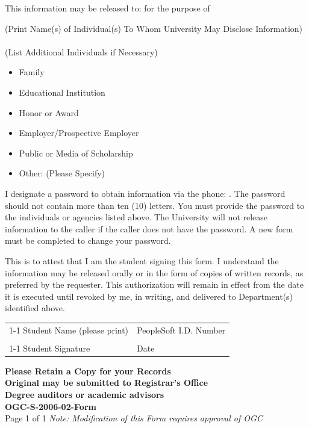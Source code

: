 \documentclass[12pt]{article}
\begin{document}
\vspace{0.5em}
This information may be released to: \underline{\hspace{5cm}} for the purpose of \underline{\hspace{5cm}}\\
\begin{center}
(Print Name(s) of Individual(s) To Whom University May Disclose Information)\\
\vspace{0.5em}
\underline{\hspace{10cm}}\\
(List Additional Individuals if Necessary)
\end{center}

\begin{itemize}[leftmargin=0.7cm, label=$\square$]
\item Family
\item Educational Institution
\item Honor or Award
\item Employer/Prospective Employer
\item Public or Media of Scholarship
\item Other: (Please Specify)\underline{\hspace{10cm}}
\end{itemize}

\vspace{0.5em}
I designate a password to obtain information via the phone: \underline{\hspace{5cm}}. The password should not contain more than ten (10) letters. You must provide the password to the individuals or agencies listed above. The University will not release information to the caller if the caller does not have the password. A new form must be completed to change your password.

\vspace{0.5em}
This is to attest that I am the student signing this form. I understand the information may be released orally or in the form of copies of written records, as preferred by the requester. This authorization will remain in effect from the date it is executed until revoked by me, in writing, and delivered to Department(s) identified above.

\vspace{2em}
\noindent\begin{tabular}{@{}p{}p{}@{}}
\cline{1-1}\cline{2-2}
Student Name (please print) & PeopleSoft I.D. Number \\
& \\
\cline{1-1}\cline{2-2}
Student Signature & Date \\
\end{tabular}

\vspace{1em}
\textbf{Please Retain a Copy for your Records}\\
\textbf{Original may be submitted to Registrar's Office}\\
\textbf{Degree auditors or academic advisors}\\
\textbf{OGC-S-2006-02-Form}\\
Page 1 of 1 \hfill \textit{Note: Modification of this Form requires approval of OGC}
\end{document}
